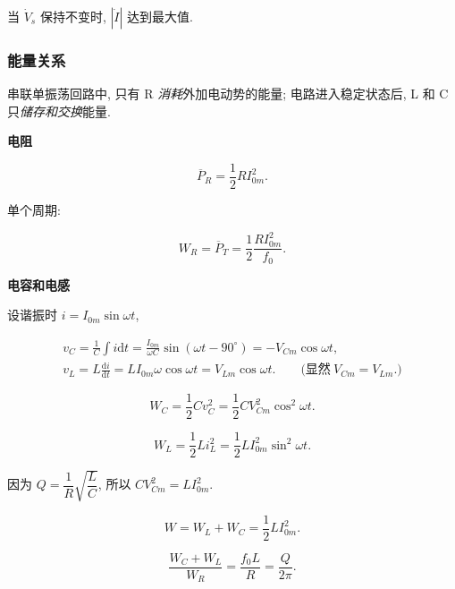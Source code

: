 当 $\dot{V}_s$ 保持不变时, $|\dot{I}|$ 达到最大值.

\subsubsection{能量关系} \label{能量关系}

串联单振荡回路中, 只有 R \textit{消耗}外加电动势的能量; 电路进入稳定状态后, L 和 C 只\textit{储存和交换}能量.

\textbf{电阻}

\begin{equation}
    \overline{P}_R=\frac{1}{2}RI_{0m}^2.
\end{equation}

单个周期:

\begin{equation}
    W_R=\overline{P}_T=\frac{1}{2}\frac{RI_{0m}^2}{f_0}.
\end{equation}

\textbf{电容和电感}

设谐振时 $i=I_{0m}\sin\omega t$,

\begin{equation*}
    \begin{gathered}
        v_C=\frac{1}{C}\int i\mathrm{d}t=\frac{I_{0m}}{\omega C}\sin(\omega t-90^\circ)=-V_{Cm}\cos\omega t, \\
        v_L=L\frac{\mathrm{d}i}{\mathrm{d}t}=LI_{0m}\omega\cos\omega t=V_{Lm}\cos\omega t.\qquad\textrm{(显然}\ V_{Cm}=V_{Lm}\textrm{.)}
    \end{gathered}
\end{equation*}

\begin{equation}
    W_C=\frac{1}{2}Cv_C^2=\frac{1}{2}CV_{Cm}^2\cos^2\omega t.
\end{equation}

\begin{equation}
    W_L=\frac{1}{2}Li_L^2=\frac{1}{2}LI_{0m}^2\sin^2\omega t.
\end{equation}

因为 $Q=\dfrac{1}{R}\sqrt{\dfrac{L}{C}}$, 所以 $CV_{Cm}^2=LI_{0m}^2$.

\begin{equation}
    W=W_L+W_C=\frac{1}{2}LI_{0m}^2.
\end{equation}

\begin{equation}
    \frac{W_C+W_L}{W_R}=\frac{f_0L}{R}=\frac{Q}{2\pi}.
\end{equation}

